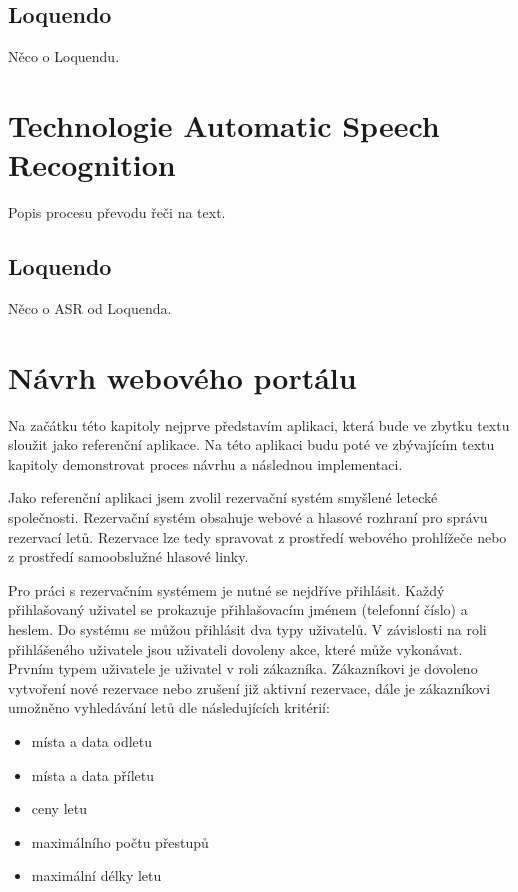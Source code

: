 \documentclass[ing,male,java,dept460]{diploma}						%
\begin{document}
\subsection{Loquendo}
Něco o Loquendu.

\section{Technologie Automatic Speech Recognition}
\label{sec:ASR}
Popis procesu převodu řeči na text.

\subsection{Loquendo}
Něco o ASR od Loquenda.

\section{Návrh webového portálu}
\label{sec:Navrh}
Na začátku této kapitoly nejprve představím aplikaci, která bude ve zbytku textu sloužit jako referenční aplikace. Na této aplikaci budu poté ve zbývajícím textu kapitoly demonstrovat proces návrhu a následnou implementaci.

Jako referenční aplikaci jsem zvolil rezervační systém smyšlené letecké společnosti. Rezervační systém obsahuje webové a hlasové rozhraní pro správu rezervací letů. Rezervace lze tedy spravovat z prostředí webového prohlížeče nebo z prostředí samoobslužné hlasové linky.

Pro práci s rezervačním systémem je nutné se nejdříve přihlásit. Každý přihlašovaný uživatel se prokazuje přihlašovacím jménem (telefonní číslo) a heslem. Do systému se můžou přihlásit dva typy uživatelů. V závislosti na roli přihlášeného uživatele jsou uživateli dovoleny akce, které může vykonávat. Prvním typem uživatele je uživatel v roli zákazníka. Zákazníkovi je dovoleno vytvoření nové rezervace nebo zrušení již aktivní rezervace, dále je zákazníkovi umožněno vyhledávání letů dle následujících kritérií:

\begin{itemize}
\item místa a data odletu
\item místa a data příletu
\item ceny letu
\item maximálního počtu přestupů
\item maximální délky letu
\end{itemize}
\end{document}
